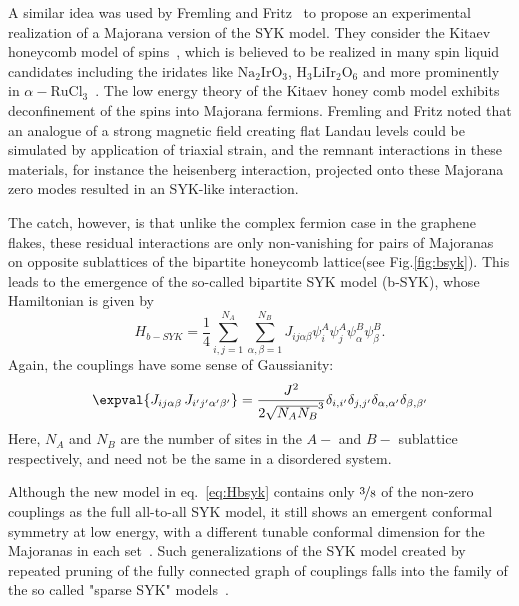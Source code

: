\par 
A similar idea was used by Fremling and Fritz~\cite{fremling_bipartite_2021} to propose an experimental realization of a Majorana version of the SYK model. They consider the Kitaev honeycomb model of spins~\cite{kitaev2006anyons}, which is believed to be realized in many spin liquid candidates including the iridates like $\mathrm{Na}_2\mathrm{IrO}_3$, $\mathrm{H}_3\mathrm{Li}\mathrm{Ir}_2\mathrm{O}_6$ and more prominently in $\alpha-\mathrm{RuCl}_3$~\cite{trebst2022kitaev,banerjee2017neutron}. The low energy theory of the Kitaev honey comb model exhibits deconfinement of the spins into Majorana fermions. Fremling and Fritz noted that an analogue of a strong magnetic field creating flat Landau levels could be simulated by application of triaxial strain, and the remnant interactions in these materials, for instance the heisenberg interaction, projected onto these Majorana zero modes resulted in an SYK-like interaction.
\par
The catch, however, is that unlike the complex fermion case in the graphene flakes, these residual interactions are only non-vanishing for pairs of Majoranas on opposite sublattices of the bipartite honeycomb lattice(see Fig.\ref{fig:bsyk}). This leads to the emergence of the so-called bipartite SYK model (b-SYK), whose Hamiltonian is given by 
\begin{equation}
    H_{b-SYK} = \frac{1}{4}\sum_{i,j=1}^{N_A}\sum_{\alpha,\beta = 1}^{N_B} J_{ij\alpha\beta}\psi^A_i\psi^A_j\psi^B_\alpha\psi^B_{\beta}. 
    \label{eq:Hbsyk}
\end{equation}
Again, the couplings have some sense of Gaussianity: 
\begin{equation}
    \expval{J_{ij\alpha\beta}\,J_{i^\prime j^\prime \alpha^\prime \beta^\prime}} = \frac{J^2}{2\sqrt{N_A N_B}^3}\delta_{i,i^\prime}\delta_{j,j^\prime}\delta_{\alpha,\alpha^\prime}\delta_{\beta,\beta^\prime}
\end{equation}
Here, $N_A$ and $N_B$ are the number of sites in the $A-$ and $B-$ sublattice respectively, and need not be the same in a disordered system.
\par
Although the new model in eq.~\ref{eq:Hbsyk} contains only $\nicefrac{3}{8}$ of the non-zero couplings as the full all-to-all SYK model, it still shows an emergent conformal symmetry at low energy, with a different tunable conformal dimension for the Majoranas in each set~\cite{Fremling_2022}. Such generalizations of the SYK model created by repeated pruning of the fully connected graph of couplings falls into the family of the so called "sparse SYK" models~\cite{xu_sparse_2020,garcia-garcia_sparse_2021,caceres2021sparse,caceres2023out}.

